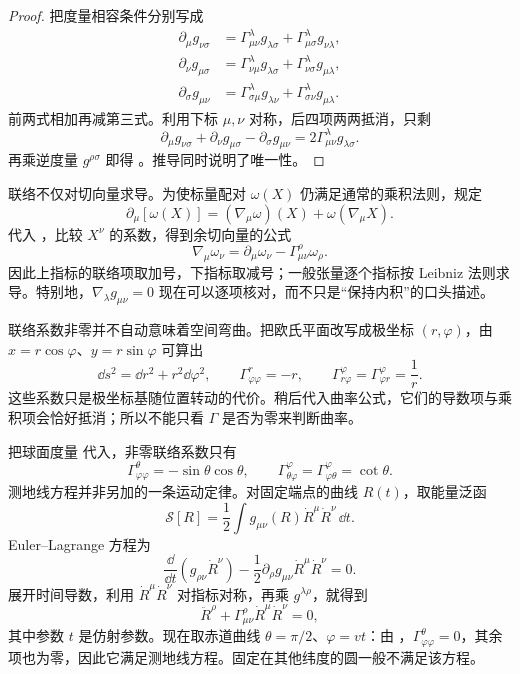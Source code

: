 \begin{proof}
把度量相容条件分别写成
\[
\begin{aligned}
\partial_\mu g_{\nu\sigma}
&=\Gamma^\lambda_{\mu\nu}g_{\lambda\sigma}
+\Gamma^\lambda_{\mu\sigma}g_{\nu\lambda},\\
\partial_\nu g_{\mu\sigma}
&=\Gamma^\lambda_{\nu\mu}g_{\lambda\sigma}
+\Gamma^\lambda_{\nu\sigma}g_{\mu\lambda},\\
\partial_\sigma g_{\mu\nu}
&=\Gamma^\lambda_{\sigma\mu}g_{\lambda\nu}
+\Gamma^\lambda_{\sigma\nu}g_{\mu\lambda}.
\end{aligned}
\]
前两式相加再减第三式。利用下标 \(\mu,\nu\) 对称，后四项两两抵消，只剩
\[
\partial_\mu g_{\nu\sigma}
+\partial_\nu g_{\mu\sigma}
-\partial_\sigma g_{\mu\nu}
=2\Gamma^\lambda_{\mu\nu}g_{\lambda\sigma}.
\]
再乘逆度量 \(g^{\rho\sigma}\) 即得
。推导同时说明了唯一性。
\end{proof}

联络不仅对切向量求导。为使标量配对 \(\omega(X)\) 仍满足通常的乘积法则，规定
\[
\partial_\mu[\omega(X)]
=(\nabla_\mu\omega)(X)+\omega(\nabla_\mu X).
\]
代入 ，比较 \(X^\nu\) 的系数，得到余切向量的公式
\begin{equation}
\nabla_\mu\omega_\nu
=\partial_\mu\omega_\nu-\Gamma^\rho_{\mu\nu}\omega_\rho.
\label{eq:bh-covariant-derivative-covector}
\end{equation}
因此上指标的联络项取加号，下指标取减号；一般张量逐个指标按 Leibniz 法则求导。特别地，\(\nabla_\lambda g_{\mu\nu}=0\) 现在可以逐项核对，而不只是“保持内积”的口头描述。

联络系数非零并不自动意味着空间弯曲。把欧氏平面改写成极坐标 \((r,\varphi)\)，由 \(x=r\cos\varphi\)、\(y=r\sin\varphi\) 可算出
\[
\dd s^2=\dd r^2+r^2\dd\varphi^2,
\qquad
\Gamma^r_{\varphi\varphi}=-r,
\qquad
\Gamma^\varphi_{r\varphi}=\Gamma^\varphi_{\varphi r}=\frac1r.
\]
这些系数只是极坐标基随位置转动的代价。稍后代入曲率公式，它们的导数项与乘积项会恰好抵消；所以不能只看 \(\Gamma\) 是否为零来判断曲率。

把球面度量  代入，非零联络系数只有
\begin{equation}
\Gamma^\theta_{\varphi\varphi}
=-\sin\theta\cos\theta,
\qquad
\Gamma^\varphi_{\theta\varphi}
=\Gamma^\varphi_{\varphi\theta}
=\cot\theta.
\label{eq:bh-sphere-christoffel}
\end{equation}
测地线方程并非另加的一条运动定律。对固定端点的曲线 \(R(t)\)，取能量泛函
\[
\mathcal S[R]=\frac12\int g_{\mu\nu}(R)\dot R^\mu\dot R^\nu\,\dd t.
\]
Euler--Lagrange 方程为
\[
\frac{\dd}{\dd t}(g_{\rho\nu}\dot R^\nu)
-\frac12\partial_\rho g_{\mu\nu}\dot R^\mu\dot R^\nu=0.
\]
展开时间导数，利用 \(\dot R^\mu\dot R^\nu\) 对指标对称，再乘 \(g^{\lambda\rho}\)，就得到
\begin{equation}
 \ddot R^\rho
 +\Gamma^\rho_{\mu\nu}\dot R^\mu\dot R^\nu=0,
 \label{eq:bh-geodesic-equation}
\end{equation}
其中参数 \(t\) 是仿射参数。现在取赤道曲线 \(\theta=\pi/2\)、\(\varphi=vt\)：由 ，\(\Gamma^\theta_{\varphi\varphi}=0\)，其余项也为零，因此它满足测地线方程。固定在其他纬度的圆一般不满足该方程。

